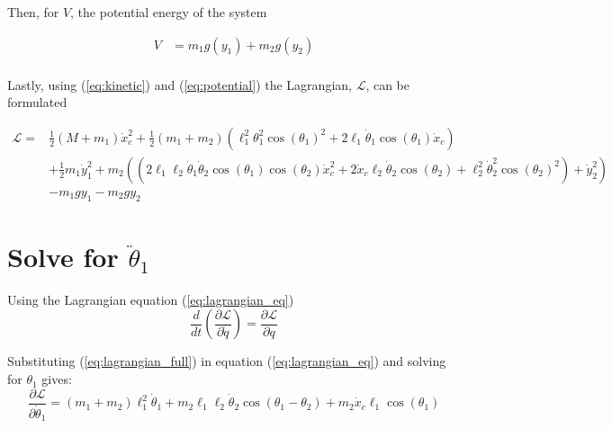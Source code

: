 \documentclass[10pt]{article}
\begin{document}
    Then, for $V$, the potential energy of the system

    \begin{equation} \label{eq:potential}
        \begin{aligned}
        V &= m_1g(y_1) + m_2g(y_2)  \\
        \end{aligned}
    \end{equation}
    
    Lastly, using (\ref{eq:kinetic}) and (\ref{eq:potential}) the 
    Lagrangian, $\mathcal{L}$, can be formulated
    
    \begin{equation} \label{eq:lagrangian_full}
        \begin{aligned}
            \mathcal{L} = &\frac{1}{2}  (M + m_1)  \dot x_c^2 + \frac{1}{2} (m_1 + m_2)(\ell_1^2\theta_1^2\cos(\theta_1)^2 + 2\ell_1\dot\theta_1\cos(\theta_1)\dot x_c)\\
            &+  \frac{1}{2} m_1\dot y_1^2 + m_2 \left((2\ell_1\ell_2\dot\theta_1\dot\theta_2\cos(\theta_1)\cos(\theta_2)\dot x_c^2 + 2\dot x_c \ell_2 \dot \theta_2 \cos(\theta_2) + \ell_2^2\dot\theta_2^2\cos(\theta_2)^2) + \dot y_2^2\right)\\
            & -m_1gy_1 - m_2gy_2
        \end{aligned}
    \end{equation}
    

    \pagebreak
    \section{Solve for $\ddot \theta_1$}

    Using the Lagrangian equation (\ref{eq:lagrangian_eq})
    \begin{equation} \label{eq:lagrangian_eq}
        \frac{d}{dt} \left(\frac{\partial \mathcal{L}}{\partial \dot q} \right) = 
        \frac{\partial \mathcal{L}}{\partial q}
    \end{equation}

    Substituting (\ref{eq:lagrangian_full}) in equation (\ref{eq:lagrangian_eq}) and solving for $\theta_1$ gives:
    \begin{equation} \label{eq: lagrange Step1}
        \frac{\partial \mathcal{L}}{\partial \dot\theta_1} = 
         (m_1 + m_2)\ell_1^2\dot\theta_1 + m_2\ell_1\ell_2\dot\theta_2\cos(\theta_1 - \theta_2) + m_2\dot x_c\ell_1\cos(\theta_1)
    \end{equation}
\end{document}
